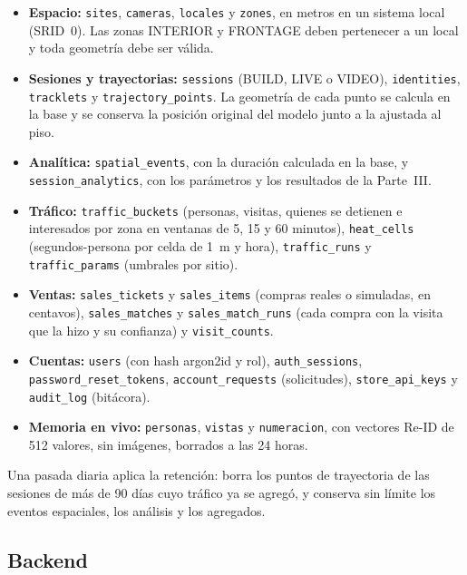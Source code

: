 \documentclass[12pt,a4paper]{article}
\begin{document}
\begin{itemize}\sloppy
    \item \textbf{Espacio:} \texttt{sites}, \texttt{cameras}, \texttt{locales}
    y \texttt{zones}, en metros en un sistema local (SRID~0). Las zonas
    INTERIOR y FRONTAGE deben pertenecer a un local y toda geometría debe ser
    válida.
    \item \textbf{Sesiones y trayectorias:} \texttt{sessions} (BUILD, LIVE o VIDEO),
    \texttt{identities}, \texttt{tracklets} y \texttt{trajectory\_points}. La
    geometría de cada punto se calcula en la base y se conserva la posición
    original del modelo junto a la ajustada al piso.
    \item \textbf{Analítica:} \texttt{spatial\_events}, con la duración
    calculada en la base, y \texttt{session\_analytics}, con los parámetros y
    los resultados de la Parte~III.
    \item \textbf{Tráfico:} \texttt{traffic\_buckets} (personas, visitas,
    quienes se detienen e interesados por zona en ventanas de 5, 15 y 60
    minutos), \texttt{heat\_cells} (segundos-persona por celda de 1~m y hora),
    \texttt{traffic\_runs} y \texttt{traffic\_params} (umbrales por sitio).
    \item \textbf{Ventas:} \texttt{sales\_tickets} y \texttt{sales\_items}
    (compras reales o simuladas, en centavos), \texttt{sales\_matches} y
    \texttt{sales\_match\_runs} (cada compra con la visita que la hizo y su
    confianza) y \texttt{visit\_counts}.
    \item \textbf{Cuentas:} \texttt{users} (con hash argon2id y rol),
    \texttt{auth\_sessions}, \texttt{password\_reset\_tokens},
    \texttt{account\_requests} (solicitudes), \texttt{store\_api\_keys} y
    \texttt{audit\_log} (bitácora).
    \item \textbf{Memoria en vivo:} \texttt{personas}, \texttt{vistas} y
    \texttt{numeracion}, con vectores Re-ID de 512 valores, sin imágenes, borrados a las 24 horas.
\end{itemize}

Una pasada diaria aplica la retención: borra los puntos de trayectoria de las
sesiones de más de 90 días cuyo tráfico ya se agregó, y conserva sin límite los
eventos espaciales, los análisis y los agregados.

\subsection{Backend}
\end{document}
